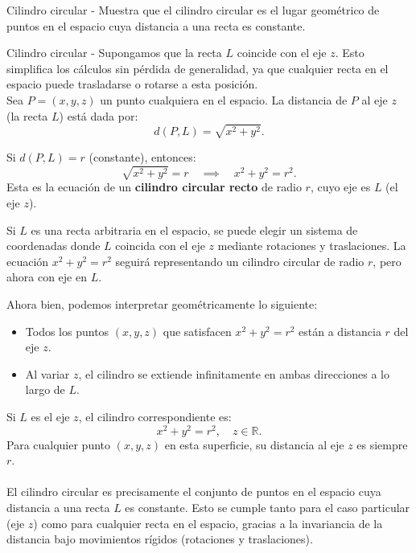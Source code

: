 \documentclass[11pt,letterpaper]{article}
\begin{document}
\begin{inciso}{Cilindro circular}
- Muestra que el cilindro circular es el lugar geométrico de puntos en el espacio cuya distancia a una recta es constante.
\begin{problema}{Cilindro circular}
- Supongamos que la recta \( L \) coincide con el eje \( z \). Esto simplifica los cálculos sin pérdida de generalidad, ya que cualquier recta en el espacio puede trasladarse o rotarse a esta posición.\\
Sea \( P = (x, y, z) \) un punto cualquiera en el espacio. La distancia de \( P \) al eje \( z \) (la recta \( L \)) está dada por:
\[
d(P, L) = \sqrt{x^2 + y^2}.
\]

Si \( d(P, L) = r \) (constante), entonces:
\[
\sqrt{x^2 + y^2} = r \quad \implies \quad x^2 + y^2 = r^2.
\]
Esta es la ecuación de un \textbf{cilindro circular recto} de radio \( r \), cuyo eje es \( L \) (el eje \( z \)).

Si \( L \) es una recta arbitraria en el espacio, se puede elegir un sistema de coordenadas donde \( L \) coincida con el eje \( z \) mediante rotaciones y traslaciones. La ecuación \( x^2 + y^2 = r^2 \) seguirá representando un cilindro circular de radio \( r \), pero ahora con eje en \( L \).

Ahora bien, podemos interpretar geométricamente lo siguiente: 

\begin{itemize}
    \item Todos los puntos \( (x, y, z) \) que satisfacen \( x^2 + y^2 = r^2 \) están a distancia \( r \) del eje \( z \).
    \item Al variar \( z \), el cilindro se extiende infinitamente en ambas direcciones a lo largo de \( L \).
\end{itemize}

Si \( L \) es el eje \( z \), el cilindro correspondiente es:
\[
x^2 + y^2 = r^2, \quad z \in \mathbb{R}.
\]
Para cualquier punto \( (x, y, z) \) en esta superficie, su distancia al eje \( z \) es siempre \( r \).
\\\\
El cilindro circular es precisamente el conjunto de puntos en el espacio cuya distancia a una recta \( L \) es constante. Esto se cumple tanto para el caso particular (eje \( z \)) como para cualquier recta en el espacio, gracias a la invariancia de la distancia bajo movimientos rígidos (rotaciones y traslaciones).
\end{problema}

\end{inciso}
\end{document}
